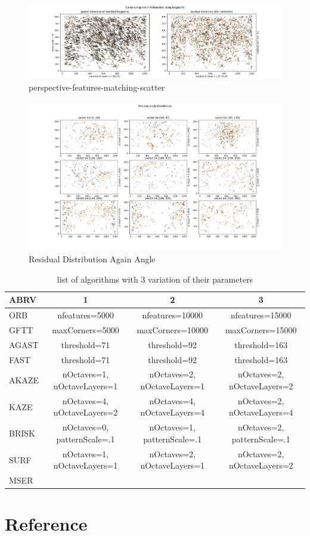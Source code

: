 \documentclass[]{elsarticle}
\begin{document}
	\begin{figure}[H]
		\centering
		\includegraphics[width=\linewidth]{../figures/perspective-features-matching-scatter.png}
		\caption{perspective-features-matching-scatter}
		\label{fig:perspective-features-matching-scatter}
	\end{figure}

	\begin{figure}[H]
		\centering
		\includegraphics[width=\linewidth]{../figures/perspective-features-residual.png}
		\caption{Residual Distribution Again Angle}
		\label{fig:residual-angle}
	\end{figure}

	\begin{table}[H]
	\begin{tabular}{|l|c|c|c| } 
		\hline
		ABRV & 1 & 2 & 3 \\
		\hline
		ORB & nfeatures=5000 & nfeatures=10000 & nfeatures=15000 \\
		GFTT & maxCorners=5000 & maxCorners=10000 & maxCorners=15000 \\
		AGAST & threshold=71 & threshold=92 & threshold=163 \\
		FAST & threshold=71 & threshold=92 & threshold=163 \\
		AKAZE & nOctaves=1, nOctaveLayers=1 & nOctaves=2, nOctaveLayers=1 & nOctaves=2, nOctaveLayers=2 \\
		KAZE & nOctaves=4, nOctaveLayers=2 & nOctaves=4, nOctaveLayers=4 & nOctaves=2, nOctaveLayers=4 \\
		BRISK & nOctaves=0, patternScale=.1 & nOctaves=1, patternScale=.1 & nOctaves=2, patternScale=.1  \\
		SURF & nOctaves=1, nOctaveLayers=1 & nOctaves=2, nOctaveLayers=1 & nOctaves=2, nOctaveLayers=2 \\
		MSER & & & \\
		\hline
	\end{tabular}
	\caption{list of algorithms with 3 variation of their parameters}
	\label{tab:used-algorithms}
	\end{table}
	
	\section{Reference}
	
	
	
\end{document}
